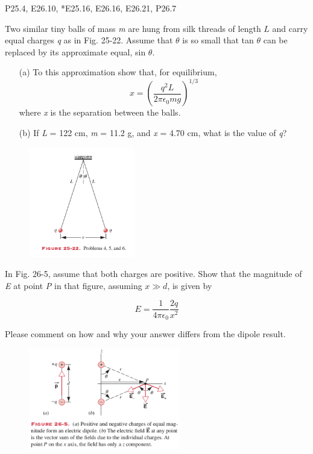 \documentclass[11pt,letterpaper,boxed]{pset}
\begin{document}
    \begin{center}
    	P25.4, E26.10, *E25.16, E26.16, E26.21, P26.7
    \end{center}
    
    \begin{problem} [P25.4]
    	Two similar tiny balls of mass \textit{m} are hung from silk threads of length $L$ and carry equal charges \textit{q} as in Fig. 25-22. Assume that $\theta$ is so small that tan $\theta$ can be replaced by its approximate equal, sin $\theta$.
    	
    	\begin{itemize}
    	    \item [(a)] To this approximation show that, for equilibrium, 
    	    \[ x = (\frac{q^2 L}{2 \pi \epsilon_0 mg})^{1/3} \]
    	    where \textit{x} is the separation between the balls.
    	    \item [(b)] If \textit{L} = 122 cm, \textit{m} = 11.2 g, and \textit{x} = 4.70 cm, what is the value of \textit{q}?
    	\end{itemize}
    \end{problem}
    
    \begin{figure} [ht]
        \includegraphics[width=175px]{HW1Images/P25-4.png}
        \label{fig:P25-4}
    \end{figure}
    \newpage
    
    \begin{problem} [E26.10]
    	In Fig. 26-5, assume that both charges are positive. Show that the magnitude of \textit{E} at point \textit{P} in that figure, assuming $x \gg d$, is given by
    	
    	\[ E = \frac{1}{4\pi\epsilon_0}\frac{2q}{x^2} \]
    	
    	Please comment on how and why your answer differs from the dipole result.
    \end{problem}
    
    \begin{figure} [ht]
        \includegraphics[width=250px]{HW1Images/E26-10.png}
        \label{fig:E26-10}
    \end{figure}
    \newpage
    
\end{document}
